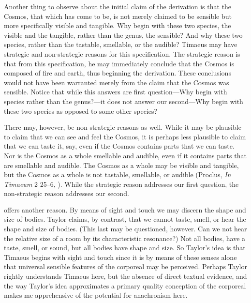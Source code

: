 
Another thing to observe about the initial claim of the derivation is that the Cosmos, that which has come to be, is not merely claimed to be sensible but more specifically visible and tangible. Why begin with these two species, the visible and the tangible, rather than the genus, the sensible? And why these two species, rather than the tastable, smellable, or the audible?  Timaeus may have strategic and non-strategic reasons for this specification. The strategic reason is that from this specification, he may immediately conclude that the Cosmos is composed of fire and earth, thus beginning the derivation. These conclusions would not have been warranted merely from the claim that the Cosmos was sensible. Notice that while this answers are first question---Why begin with species rather than the genus?---it does not answer our second---Why begin with these two species as opposed to some other species? 

There may, however, be non-strategic reasons as well. While it may be plausible to claim that we can see and feel the Cosmos, it is perhaps less plausible to claim that we can taste it, say, even if the Cosmos contains parts that we can taste. Nor is the Cosmos as a whole smellable and audible, even if it contains parts that are smellable and audible. The Cosmos as a whole may be visible and tangible, but the Cosmos as a whole is not tastable, smellable, or audible (Proclus, \emph{In Timaeum} 2 25--6, \citealt{Diehl:1903re}). While the strategic reason addresses our first question, the non-strategic reason addresses our second. 

\citet[93]{Taylor:1928qb} offers another reason. By means of sight and touch we may discern the shape and size of bodies. Taylor claims, by contrast, that we cannot taste, smell, or hear the shape and size of bodies. (This last may be questioned, however. Can we not hear the relative size of a room by its characteristic resonance?) Not all bodies, have a taste, smell, or sound, but all bodies have shape and size. So Taylor's idea is that Timaeus begins with sight and touch since it is by means of these senses alone that universal sensible features of the corporeal may be perceived. Perhaps Taylor rightly understands Timaeus here, but the absence of direct textual evidence, and the way Taylor's idea approximates a primary quality conception of the corporeal makes me apprehensive of the potential for anachronism here.

